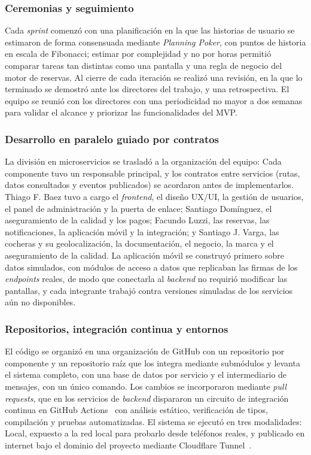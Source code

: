 \documentclass[conference,a4paper]{IEEEtran}
\begin{document}
\subsubsection{Ceremonias y seguimiento}
Cada \textit{sprint} comenzó con una planificación en la que las historias de usuario se estimaron de forma consensuada mediante \textit{Planning Poker}, con puntos de historia en escala de Fibonacci; estimar por complejidad y no por horas permitió comparar tareas tan distintas como una pantalla y una regla de negocio del motor de reservas. Al cierre de cada iteración se realizó una revisión, en la que lo terminado se demostró ante los directores del trabajo, y una retrospectiva. El equipo se reunió con los directores con una periodicidad no mayor a dos semanas para validar el alcance y priorizar las funcionalidades del MVP.

\subsubsection{Desarrollo en paralelo guiado por contratos}
La división en microservicios se trasladó a la organización del equipo: Cada componente tuvo un responsable principal, y los contratos entre servicios (rutas, datos consultados y eventos publicados) se acordaron antes de implementarlos. Thiago F. Baez tuvo a cargo el \textit{frontend}, el diseño UX/UI, la gestión de usuarios, el panel de administración y la puerta de enlace; Santiago Domínguez, el aseguramiento de la calidad y los pagos; Facundo Luzzi, las reservas, las notificaciones, la aplicación móvil y la integración; y Santiago J. Varga, las cocheras y su geolocalización, la documentación, el negocio, la marca y el aseguramiento de la calidad. La aplicación móvil se construyó primero sobre datos simulados, con módulos de acceso a datos que replicaban las firmas de los \textit{endpoints} reales, de modo que conectarla al \textit{backend} no requirió modificar las pantallas, y cada integrante trabajó contra versiones simuladas de los servicios aún no disponibles.

\subsubsection{Repositorios, integración continua y entornos}
El código se organizó en una organización de GitHub con un repositorio por componente y un repositorio raíz que los integra mediante submódulos y levanta el sistema completo, con una base de datos por servicio y el intermediario de mensajes, con un único comando. Los cambios se incorporaron mediante \textit{pull requests}, que en los servicios de \textit{backend} dispararon un circuito de integración continua en GitHub Actions~\cite{githubactions} con análisis estático, verificación de tipos, compilación y pruebas automatizadas. El sistema se ejecutó en tres modalidades: Local, expuesto a la red local para probarlo desde teléfonos reales, y publicado en internet bajo el dominio del proyecto mediante Cloudflare Tunnel~\cite{cloudflaretunnel}.
\end{document}
